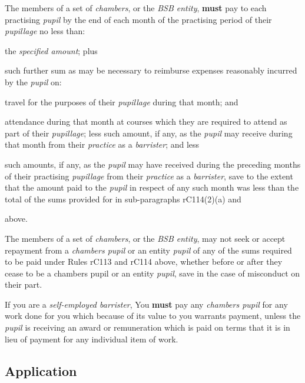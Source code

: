The members of a set of \emph{chambers}, or the \emph{BSB entity}, \textcolor{myred}{\textbf{must}}
pay to each practising \emph{pupil} by the end of each month of the
practising period of their \emph{pupillage} no less than:
\begin{numlist}
\item the \emph{specified amount}; plus

\item such further sum as may be necessary to reimburse expenses reasonably
incurred by the \emph{pupil} on:
\begin{alphlist}
\item travel for the purposes of their \emph{pupillage} during that month;
and

\item attendance during that month at courses which they are required to
attend as part of their \emph{pupillage}; less such amount, if any, as the \emph{pupil} may receive during that month
from their \emph{practice} as a \emph{barrister}; and less
\item such amounts, if any, as the \emph{pupil} may have received during
the preceding months of their practising \emph{pupillage} from their
\emph{practice} as a \emph{barrister}, save to the extent that the
amount paid to the \emph{pupil} in respect of any such month was less
than the total of the sums provided for in sub-paragraphs rC114(2)(a) and\item above.
\end{alphlist}
\end{numlist}


The members of a set of \emph{chambers}, or the \emph{BSB entity}, may
not seek or accept repayment from a \emph{chambers pupil} or an entity
\emph{pupil} of any of the sums required to be paid under Rules rC113
and rC114 above, whether before or after they cease to be a chambers
pupil or an entity \emph{pupil}, save in the case of misconduct on their
part.


If you are a \emph{self-employed barrister}, You \textcolor{myred}{\textbf{must}} pay any
\emph{chambers pupil} for any work done for you which because of its
value to you warrants payment, unless the \emph{pupil} is receiving an
award or remuneration which is paid on terms that it is in lieu of
payment for any individual item of work.

\subsection{Application}

